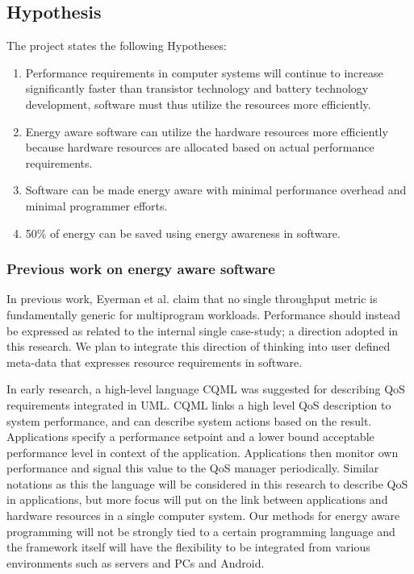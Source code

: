 \documentclass{article}
\begin{document}
\subsection{Hypothesis}
The project states the following Hypotheses:

\begin{enumerate}
 \item Performance requirements in computer systems will continue to increase significantly faster than transistor technology and battery technology development, software must thus utilize the resources more efficiently. \vspace{-0.2cm}
 \item Energy aware software can utilize the hardware resources more efficiently because hardware resources are allocated based on actual performance requirements.\vspace{-0.2cm}
 \item Software can be made energy aware with minimal performance overhead and minimal programmer efforts.\vspace{-0.2cm}
 \item 50\% of energy can be saved using energy awareness in software.
\end{enumerate}



\subsubsection{Previous work on energy aware software}
In previous work, Eyerman et al. \cite{Eyerman:09} claim that no single throughput metric is fundamentally generic for multiprogram workloads. 
Performance should instead be expressed as related to the internal single case-study; a direction adopted in this research. 
We plan to integrate this direction of thinking into user defined meta-data that expresses resource requirements in software.\smallskip

In early research, a high-level language CQML \cite{Aagedal:01} was suggested for describing QoS requirements integrated in UML. 
CQML links a high level QoS description to system performance, and can describe system actions based on the result. 
Applications specify a performance setpoint and a lower bound acceptable performance level in context of the application. 
Applications then monitor own performance and signal this value to the QoS manager periodically. 
Similar notations as this the language will be considered in this research to describe QoS in applications, 
but more focus will put on the link between applications and hardware resources in a single computer system.
Our methods for energy aware programming will not be strongly tied to a certain programming language and the framework itself will have the flexibility to be integrated from various environments such as servers and PCs and Android.\smallskip
\end{document}
